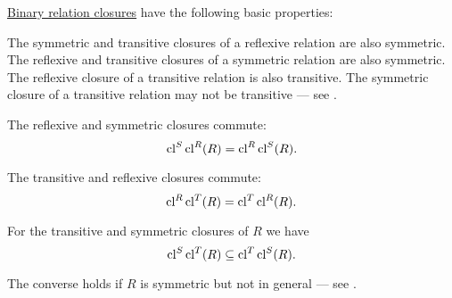 \begin{proposition}\label{thm:def:relation_closures}
  \hyperref[def:relation_closures]{Binary relation closures} have the following basic properties:
  \begin{thmenum}
     The symmetric and transitive closures of a reflexive relation are also symmetric.
     The reflexive and transitive closures of a symmetric relation are also symmetric.
     The reflexive closure of a transitive relation is also transitive. The symmetric closure of a transitive relation may not be transitive --- see .

     The reflexive and symmetric closures commute:
    \begin{equation}\label{eq:thm:def:relation_closures/reflexive_and_symmetric}
      \operatorname{cl}^S \operatorname{cl}^R(R) = \operatorname{cl}^R \operatorname{cl}^S(R).
    \end{equation}

     The transitive and reflexive closures commute:
    \begin{equation}\label{eq:thm:def:relation_closures/reflexive_and_transitive}
      \operatorname{cl}^R \operatorname{cl}^T(R) = \operatorname{cl}^T \operatorname{cl}^R(R).
    \end{equation}

     For the transitive and symmetric closures of \( R \) we have
    \begin{equation}\label{eq:thm:def:relation_closures/symmetric_and_transitive}
      \operatorname{cl}^S \operatorname{cl}^T(R) \subseteq \operatorname{cl}^T \operatorname{cl}^S(R).
    \end{equation}

    The converse holds if \( R \) is symmetric but not in general --- see .
  \end{thmenum}
\end{proposition}
